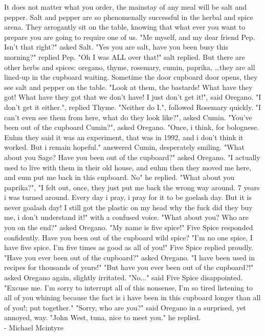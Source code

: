 \begin{preface}
It does not matter what you order, the mainstay of any meal will be salt and pepper. Salt and pepper are so phenomenally successful in the herbal and spice arena. They arrogantly sit on the table, knowing that what ever you want to prepare you are going to require one of us. "Me myself, and my dear friend Pep. Isn't that right?" asked Salt. "Yes you are salt, have you been busy this morning?" replied Pep. "Oh I was ALL over that!" salt replied. But there are other herbs and spices: oregano, thyme, rosemary, cumin, paprika, \dots they are all lined-up in the cupboard waiting. Sometime the door cupboard door opens, they see salt and pepper on the table. "Look at them, the bastards! What have they got! What have they got that we don't have! I just don't get it!", said Oregano. "I don't get it either.", replied Thyme. "Neither do I.", followed Rosemary quickly. "I can't even see them from here, what do they look like?", asked Cumin. "You've been out of the cupboard Cumin?", asked Oregano. "Once, i think, for bolognese. Euhm they said it was an experiment, that was in 1992, and i don't think it worked. But i remain hopeful." answered Cumin, desperately smiling. "What about you Sage? Have you been out of the cupboard?" asked Oregano. "I actually used to live with them in their old house, and euhm then they moved me here, and eum put me back in this cupboard. No" he replied. "What about you paprika?", "I felt out, once, they just put me back the wrong way around. 7 years i was turned around. Every day i pray, i pray for it to be goelash day. But it is never goalash day! I still got the plastic on my head why the fuck did they buy me, i don't understand it!" with a confused voice. "What about you? Who are you on the end?" asked Oregano. "My name is five spice!" Five Spice responded confidently. Have you been out of the cupboard wild spice? "I'm no one spice, I have five spice. I'm five times as good as all of you!" Five Spice replied proudly. "Have you ever been out of the cupboard?" asked Oregano. "I have been used in recipes for thousands of years!" "But have you ever been out of the cupboard?!" asked Oregano again, slightly irritated. "No..." said Five Spice disappointed. "Excuse me. I'm sorry to interrupt all of this nonsense, I'm so tired listening to all of you whining because the fact is i have been in this cupboard longer than all of you!; put together." "Sorry, who are you?" said Oregano in a surprised, yet annoyed, way. "John West, tuna, nice to meet you." he replied.\\

\hfill - \textsf{Michael Mcintyre}
\end{preface}
